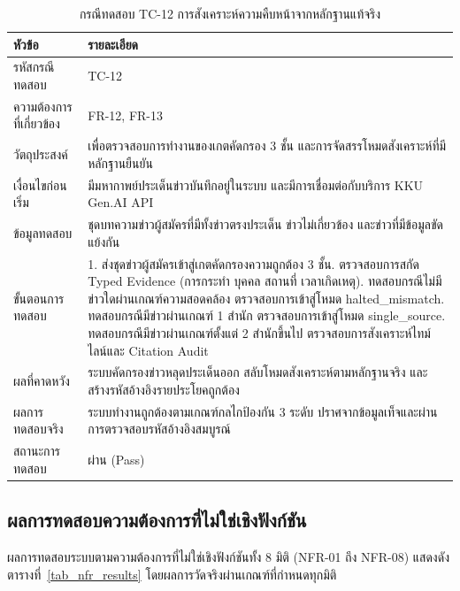 \begin{table}[H]
\centering
\caption{กรณีทดสอบ TC-12 การสังเคราะห์ความคืบหน้าจากหลักฐานแท้จริง}
\label{tab_tc12_detail}
\begin{tabularx}{\textwidth}{|L{2.8cm}|Y|}
\hline
\textbf{หัวข้อ} & \textbf{รายละเอียด} \\
\hline
รหัสกรณีทดสอบ & TC-12 \\ \hline
ความต้องการที่เกี่ยวข้อง & FR-12, FR-13 \\ \hline
วัตถุประสงค์ & เพื่อตรวจสอบการทำงานของเกตคัดกรอง 3 ชั้น และการจัดสรรโหมดสังเคราะห์ที่มีหลักฐานยืนยัน \\ \hline
เงื่อนไขก่อนเริ่ม & มีมหากาพย์ประเด็นข่าวบันทึกอยู่ในระบบ และมีการเชื่อมต่อกับบริการ KKU Gen.AI API \\ \hline
ข้อมูลทดสอบ & ชุดบทความข่าวผู้สมัครที่มีทั้งข่าวตรงประเด็น ข่าวไม่เกี่ยวข้อง และข่าวที่มีข้อมูลขัดแย้งกัน \\ \hline
ขั้นตอนการทดสอบ & 
1. ส่งชุดข่าวผู้สมัครเข้าสู่เกตคัดกรองความถูกต้อง 3 ชั้น. ตรวจสอบการสกัด Typed Evidence (การกระทำ บุคคล สถานที่ เวลาเกิดเหตุ). ทดสอบกรณีไม่มีข่าวใดผ่านเกณฑ์ความสอดคล้อง ตรวจสอบการเข้าสู่โหมด halted\_mismatch. ทดสอบกรณีมีข่าวผ่านเกณฑ์ 1 สำนัก ตรวจสอบการเข้าสู่โหมด single\_source. ทดสอบกรณีมีข่าวผ่านเกณฑ์ตั้งแต่ 2 สำนักขึ้นไป ตรวจสอบการสังเคราะห์ไทม์ไลน์และ Citation Audit \\ \hline
ผลที่คาดหวัง & ระบบคัดกรองข่าวหลุดประเด็นออก สลับโหมดสังเคราะห์ตามหลักฐานจริง และสร้างรหัสอ้างอิงรายประโยคถูกต้อง \\ \hline
ผลการทดสอบจริง & ระบบทำงานถูกต้องตามเกณฑ์กลไกป้องกัน 3 ระดับ ปราศจากข้อมูลเท็จและผ่านการตรวจสอบรหัสอ้างอิงสมบูรณ์ \\ \hline
สถานะการทดสอบ & ผ่าน (Pass) \\
\hline
\end{tabularx}
\end{table}

\subsection{ผลการทดสอบความต้องการที่ไม่ใช่เชิงฟังก์ชัน}

ผลการทดสอบระบบตามความต้องการที่ไม่ใช่เชิงฟังก์ชันทั้ง 8 มิติ (NFR-01 ถึง NFR-08) แสดงดังตารางที่~\ref{tab_nfr_results} โดยผลการวัดจริงผ่านเกณฑ์ที่กำหนดทุกมิติ

